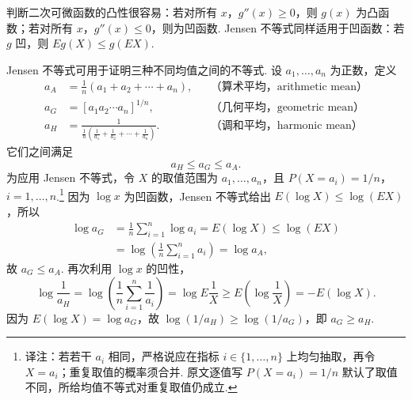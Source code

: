 判断二次可微函数的凸性很容易：若对所有 $x$，$g''(x)\ge0$，则 $g(x)$ 为凸函数；若对所有 $x$，$g''(x)\le0$，则为凹函数. Jensen 不等式同样适用于凹函数：若 $g$ 凹，则 $Eg(X)\le g(EX)$.
\begin{example}[均值的不等式]\label{ex:4.7.8}
Jensen 不等式可用于证明三种不同均值之间的不等式. 设 $a_1,\ldots,a_n$ 为正数，定义
$$\begin{aligned}
a_A&=\frac1n(a_1+a_2+\cdots+a_n),&&\text{（算术平均，arithmetic mean）}\\
a_G&=[a_1a_2\cdots a_n]^{1/n},&&\text{（几何平均，geometric mean）}\\
a_H&=\frac1{\frac1n\left(\frac1{a_1}+\frac1{a_2}+\cdots+\frac1{a_n}\right)}.&&\text{（调和平均，harmonic mean）}
\end{aligned}$$
它们之间满足
$$a_H\le a_G\le a_A.$$
为应用 Jensen 不等式，令 $X$ 的取值范围为 $a_1,\ldots,a_n$，且 $P(X=a_i)=1/n$，$i=1,\ldots,n$.\footnote{译注：若若干 $a_i$ 相同，严格说应在指标 $i\in\{1,\ldots,n\}$ 上均匀抽取，再令 $X=a_i$；重复取值的概率须合并. 原文逐值写 $P(X=a_i)=1/n$ 默认了取值不同，所给均值不等式对重复取值仍成立.} 因为 $\log x$ 为凹函数，Jensen 不等式给出 $E(\log X)\le\log(EX)$，所以
$$\begin{aligned}
\log a_G&=\frac1n\sum_{i=1}^n\log a_i=E(\log X)\le\log(EX)\\
&=\log\left(\frac1n\sum_{i=1}^na_i\right)=\log a_A,
\end{aligned}$$
故 $a_G\le a_A$. 再次利用 $\log x$ 的凹性，
$$\log\frac1{a_H}=\log\left(\frac1n\sum_{i=1}^n\frac1{a_i}\right)
=\log E\frac1X\ge E\left(\log\frac1X\right)=-E(\log X).$$
因为 $E(\log X)=\log a_G$，故 $\log(1/a_H)\ge\log(1/a_G)$，即 $a_G\ge a_H$.
\end{example}

